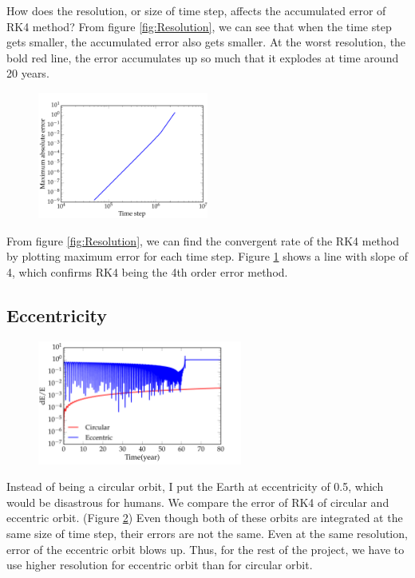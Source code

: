 \documentclass[11pt,letterpaper]{article}
\begin{document}
How does the resolution, or size of time step, affects the accumulated error of RK4 method? From figure \ref{fig:Resolution}, we can see that when the time step gets smaller, the accumulated error also gets smaller. At the worst resolution, the bold red line, the error accumulates up so much that it explodes at time around 20 years.

\begin{figure}[h!]
	\centering
	\includegraphics[width=0.5\textwidth]{Convergence}
	\caption{}
	\label{fig:Convergence}
\end{figure}

From figure \ref{fig:Resolution}, we can find the convergent rate of the RK4 method by plotting maximum error for each time step. Figure \ref{fig:Convergence} shows a line with slope of 4, which confirms RK4 being the 4th order error method.

\subsection{Eccentricity}

\begin{figure}[h!]
	\centering
	\includegraphics[width = 0.6\textwidth]{Eccentric_Error}
	\caption{}
	\label{fig:Eccentric_Error}
\end{figure}
	
Instead of being a circular orbit, I put the Earth at eccentricity of 0.5, which would be disastrous for humans. We compare the error of RK4 of circular and eccentric orbit. (Figure \ref{fig:Eccentric_Error}) Even though both of these orbits are integrated at the same size of time step, their errors are not the same. Even at the same resolution, error of the eccentric orbit blows up. Thus, for the rest of the project, we have to use higher resolution for eccentric orbit than for circular orbit.
\end{document}
